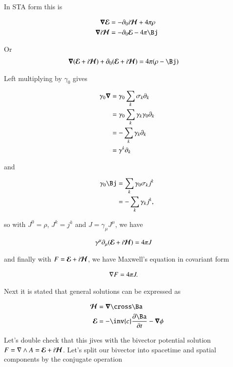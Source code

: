 In STA form this is

\begin{align*}
\spacegrad \EE &= - \partial_0 i\HH + 4 \pi \rho \\
\spacegrad i\HH &= -\partial_0 \EE - 4 \pi \Bj \\
\end{align*}

Or
\begin{align}\label{eqn:rayleigh_jeans:maxwellNotQuiteCovariant}
\spacegrad (\EE + i\HH) + \partial_0 (\EE + i\HH) &= 4 \pi (\rho - \Bj)
\end{align}

Left multiplying by $\gamma_0$ gives

\begin{align*}
\gamma_0 \boldsymbol{\nabla} 
&= \gamma_0 \sum_k \sigma_k \partial_k \\
&= \gamma_0 \sum_k \gamma_k \gamma_0 \partial_k \\
&= -\sum_k \gamma_k \partial_k \\
&= \gamma^k \partial_k \\
\end{align*}

and

\begin{align*}
\gamma_0 \Bj 
&= \sum_k \gamma_0 \sigma_k j^k \\
&= -\sum_k \gamma_k j^k,
\end{align*}

so with $J^0 = \rho$, $J^k = j^k$ and $J = \gamma_\mu J^\mu$, we have

\begin{align*}
\gamma^\mu \partial_\mu (\boldsymbol{\mathcal{E}} + i\boldsymbol{\mathcal{H}}) &= 4 \pi J
\end{align*}

and finally with $F = \boldsymbol{\mathcal{E}} + i\boldsymbol{\mathcal{H}}$, we have Maxwell's equation in covariant form

\begin{align*}
\nabla F &= 4 \pi J.
\end{align*}

Next it is stated that general solutions can be expressed as

\begin{align}\label{eqn:rayleigh_jeans:fieldsFromPotentials}
\HH &= \spacegrad \cross \Ba \\
\EE &= - \inv{c} \PD{t}{\Ba} - \spacegrad \phi
\end{align}

Let's double check that this jives with the bivector potential solution $F = \nabla \wedge A = \boldsymbol{\mathcal{E}} + i\boldsymbol{\mathcal{H}}$.  Let's split our bivector
into spacetime and spatial components by the conjugate operation

